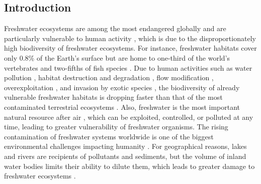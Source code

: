\documentclass[11pt, a4paper]{article}
\begin{document}
\begin{spacing}{1.5}
\clearpage

\tableofcontents 
\clearpage

\linenumbers
\renewcommand\thesection{\arabic{section}}
\section{Introduction}

Freshwater ecosystems are among the most endangered globally and are particularly vulnerable to human activity \citep{dudgeon2006freshwater}, which is due to the disproportionately high biodiversity of freshwater ecosystems. For instance, freshwater habitats cover only 0.8\% of the Earth's surface but are home to one-third of the world's vertebrates and two-fifths of fish species \citep{lundberg2000so}. Due to human activities such as water pollution \citep{schwarzenbach2010global}, habitat destruction and degradation \citep{garrick2017valuing}, flow modification \citep{poff2007homogenization}, overexploitation \citep{malmqvist2002threats}, and invasion by exotic species \citep{rahel2002homogenization}, the biodiversity of already vulnerable freshwater habitats is dropping faster than that of the most contaminated terrestrial ecosystems \citep{sala2000global}. Also, freshwater is the most important natural resource after air \citep{qadri2020freshwater}, which can be exploited, controlled, or polluted at any time, leading to greater vulnerability of freshwater organisms. The rising contamination of freshwater systems worldwide is one of the biggest environmental challenges impacting humanity \citep{inyinbor2018water}. For geographical reasons, lakes and rivers are recipients of pollutants and sediments, but the volume of inland water bodies limits their ability to dilute them, which leads to greater damage to freshwater ecosystems \citep{dudgeon2006freshwater}. 


\end{spacing}
\end{document}
